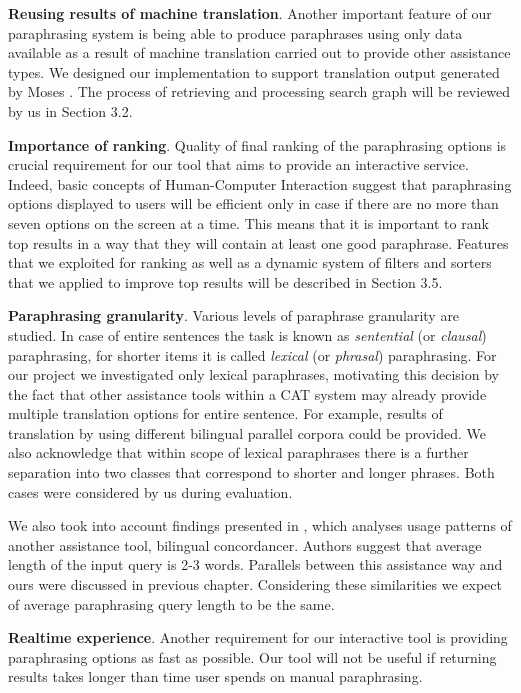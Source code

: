 \textbf{Reusing results of machine translation}. Another important feature of our paraphrasing system is being able to produce paraphrases using only data available as a result of machine translation carried out to provide other assistance types. We designed our implementation to support translation output generated by Moses \cite{koehn2007moses}. The process of retrieving and processing search graph will be reviewed by us in Section 3.2.

\textbf{Importance of ranking}. Quality of final ranking of the paraphrasing options is crucial requirement for our tool that aims to provide an interactive service. Indeed, basic concepts of Human-Computer Interaction suggest that paraphrasing options displayed to users will be efficient only in case if there are no more than seven options on the screen at a time. This means that it is important to rank top results in a way that they will contain at least one good paraphrase. Features that we exploited for ranking as well as a dynamic system of filters and sorters that we applied to improve top results will be described in Section 3.5.  

\textbf{Paraphrasing granularity}. Various levels of paraphrase granularity are studied. In case of entire sentences the task is known as \textit{sentential} (or \textit{clausal}) paraphrasing, for shorter items it is called \textit{lexical} (or \textit{phrasal}) paraphrasing. For our project we investigated only lexical paraphrases, motivating this decision by the fact that other assistance tools within a CAT system may already provide multiple translation options for entire sentence. For example, results of translation by using different bilingual parallel corpora could be provided. We also acknowledge that within scope of lexical paraphrases there is a further separation into two classes that correspond to shorter and longer phrases. Both cases were considered by us during evaluation.

We also took into account findings presented in \cite{simard2005studying}, which analyses usage patterns of another assistance tool, bilingual concordancer. Authors suggest that average length of the input query is 2-3 words. Parallels between this assistance way and ours were discussed in previous chapter. Considering these similarities we expect of average paraphrasing query length to be the same.

\textbf{Realtime experience}. Another requirement for our interactive tool is providing paraphrasing options as fast as possible. Our tool will not be useful if returning results takes longer than time user spends on manual paraphrasing. 


